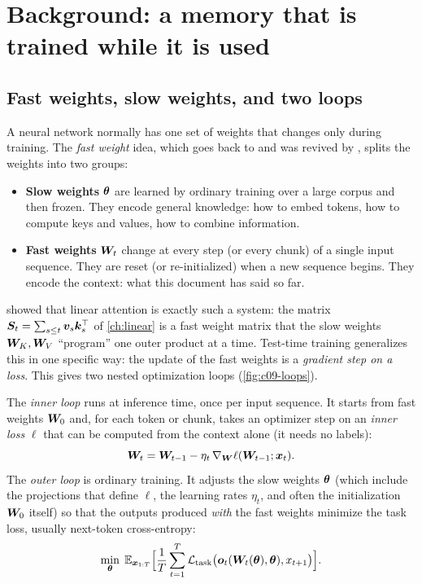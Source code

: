 \section{Background: a memory that is trained while it is used}\label{sec:c09-background}

\subsection{Fast weights, slow weights, and two loops}\label{sec:c09-fastweights}

A neural network normally has one set of weights that changes only during training. The
\emph{fast weight} idea, which goes back to \citet{schmidhuber1992fastweights} and was revived
by \citet{ba2016fastweights}, splits the weights into two groups:
\begin{itemize}
  \item \textbf{Slow weights} $\bm{\theta}$ are learned by ordinary training over a large corpus
        and then frozen. They encode general knowledge: how to embed tokens, how to compute
        keys and values, how to combine information.
  \item \textbf{Fast weights} $\bm{W}_t$ change at every step (or every chunk) of a single
        input sequence. They are reset (or re-initialized) when a new sequence begins. They
        encode the context: what this document has said so far.
\end{itemize}
\citet{c02-schlag2021linear} showed that linear attention is exactly such a system: the
matrix $\bm{S}_t = \sum_{s \le t} \bm{v}_s \bm{k}_s^{\top}$ of \cref{ch:linear} is a fast weight matrix that
the slow weights $\bm{W}_K, \bm{W}_V$ ``program'' one outer product at a time. Test-time training
generalizes this in one specific way: the update of the fast weights is a \emph{gradient step
on a loss}. This gives two nested optimization loops (\cref{fig:c09-loops}).

\begin{definition}\label{def:c09-loops}
The \emph{inner loop} runs at inference time, once per input sequence. It starts from fast
weights $\bm{W}_0$ and, for each token or chunk, takes an optimizer step on an
\emph{inner loss} $\ell$ that can be computed from the context alone (it needs no labels):
\begin{equation}\label{eq:c09-inner}
  \bm{W}_t = \bm{W}_{t-1} - \eta_t \, \nabla_{\bm{W}} \ell(\bm{W}_{t-1}; \bm{x}_t).
\end{equation}
The \emph{outer loop} is ordinary training. It adjusts the slow weights $\bm{\theta}$ (which
include the projections that define $\ell$, the learning rates $\eta_t$, and often the
initialization $\bm{W}_0$ itself) so that the outputs produced \emph{with} the fast weights
minimize the task loss, usually next-token cross-entropy:
\begin{equation}\label{eq:c09-outer}
  \min_{\bm{\theta}} \; \mathbb{E}_{\bm{x}_{1:T}} \Big[ \frac{1}{T} \sum_{t=1}^{T}
     \mathcal{L}_{\text{task}}\big(\bm{o}_t(\bm{W}_{t}(\bm{\theta}), \bm{\theta}), x_{t+1}\big) \Big].
\end{equation}
\end{definition}

